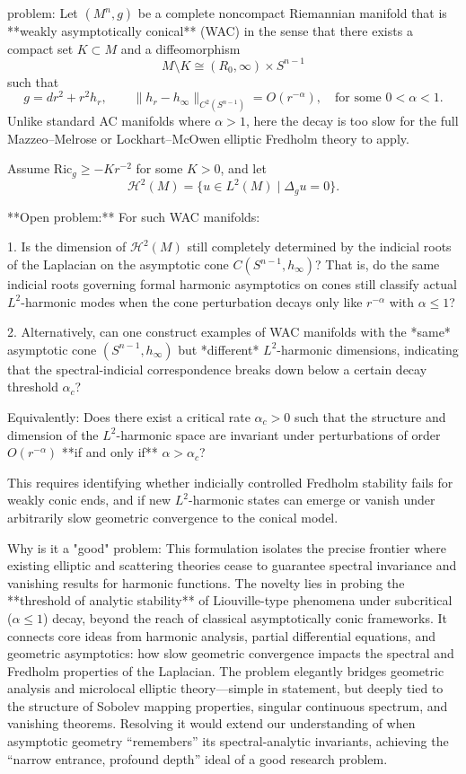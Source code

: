 problem:  
Let \((M^n,g)\) be a complete noncompact Riemannian manifold that is **weakly asymptotically conical** (WAC) in the sense that there exists a compact set \(K\subset M\) and a diffeomorphism  
\[
M\setminus K \cong (R_0,\infty)\times S^{n-1}
\]
such that  
\[
g = dr^2 + r^2 h_r, \qquad \|h_r - h_\infty\|_{C^2(S^{n-1})} = O(r^{-\alpha}), \quad \text{for some } 0<\alpha<1.
\]
Unlike standard AC manifolds where \(\alpha>1\), here the decay is too slow for the full Mazzeo–Melrose or Lockhart–McOwen elliptic Fredholm theory to apply.  

Assume \(\mathrm{Ric}_g \ge -K r^{-2}\) for some \(K>0\), and let  
\[
\mathcal{H}^2(M) = \{u\in L^2(M) \mid \Delta_g u=0\}.
\]

**Open problem:**  
For such WAC manifolds:

1. Is the dimension of \(\mathcal{H}^2(M)\) still completely determined by the indicial roots of the Laplacian on the asymptotic cone \(C(S^{n-1},h_\infty)\)? That is, do the same indicial roots governing formal harmonic asymptotics on cones still classify actual \(L^2\)-harmonic modes when the cone perturbation decays only like \(r^{-\alpha}\) with \(\alpha \le 1\)?  

2. Alternatively, can one construct examples of WAC manifolds with the *same* asymptotic cone \((S^{n-1}, h_\infty)\) but *different* \(L^2\)-harmonic dimensions, indicating that the spectral-indicial correspondence breaks down below a certain decay threshold \(\alpha_c\)?  

Equivalently:  
Does there exist a critical rate \(\alpha_c>0\) such that the structure and dimension of the \(L^2\)-harmonic space are invariant under perturbations of order \(O(r^{-\alpha})\) **if and only if** \(\alpha>\alpha_c\)?  

This requires identifying whether indicially controlled Fredholm stability fails for weakly conic ends, and if new \(L^2\)-harmonic states can emerge or vanish under arbitrarily slow geometric convergence to the conical model.

Why is it a "good" problem:  
This formulation isolates the precise frontier where existing elliptic and scattering theories cease to guarantee spectral invariance and vanishing results for harmonic functions. The novelty lies in probing the **threshold of analytic stability** of Liouville-type phenomena under subcritical (\(\alpha\le1\)) decay, beyond the reach of classical asymptotically conic frameworks. It connects core ideas from harmonic analysis, partial differential equations, and geometric asymptotics: how slow geometric convergence impacts the spectral and Fredholm properties of the Laplacian. The problem elegantly bridges geometric analysis and microlocal elliptic theory—simple in statement, but deeply tied to the structure of Sobolev mapping properties, singular continuous spectrum, and vanishing theorems. Resolving it would extend our understanding of when asymptotic geometry “remembers” its spectral-analytic invariants, achieving the “narrow entrance, profound depth” ideal of a good research problem.